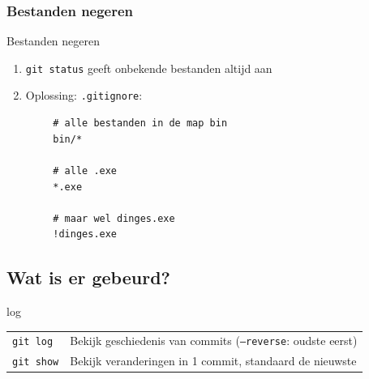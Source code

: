
\subsubsection{Bestanden negeren}
\begin{frame}[fragile]{Bestanden negeren}
	\begin{enumerate}
		\item \texttt{git status} geeft onbekende bestanden altijd aan
		\item Oplossing: \texttt{.gitignore}:
	\end{enumerate}
	\begin{verbatim}
		# alle bestanden in de map bin
		bin/*

		# alle .exe
		*.exe

		# maar wel dinges.exe
		!dinges.exe
	\end{verbatim}
\end{frame}

\subsection{Wat is er gebeurd?}
\begin{frame}{log}
	\begin{tabular}{ll}
		\texttt{git log}& Bekijk geschiedenis van commits (\texttt{--reverse}: oudste eerst)\\
		\texttt{git show}& Bekijk veranderingen in 1 commit, standaard de nieuwste
	\end{tabular}
\end{frame}

